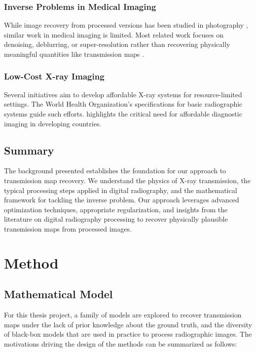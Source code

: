 \documentclass[nomenclature, english, bibtex]{kththesis}
\numberwithin{listing}{chapter}
\begin{document}
\subsection{Inverse Problems in Medical Imaging}
While image recovery from processed versions has been studied in photography \cite{moran2020deeptone}, similar work in medical imaging is limited. Most related work focuses on denoising, deblurring, or super-resolution rather than recovering physically meaningful quantities like transmission maps \cite{jin2017deep}.

\subsection{Low-Cost X-ray Imaging}
Several initiatives aim to develop affordable X-ray systems for resource-limited settings. The World Health Organization's specifications for basic radiographic systems \cite{who2014specifications} guide such efforts. \cite{mollura2010radiology} highlights the critical need for affordable diagnostic imaging in developing countries.

\section{Summary}
The background presented establishes the foundation for our approach to transmission map recovery. We understand the physics of X-ray transmission, the typical processing steps applied in digital radiography, and the mathematical framework for tackling the inverse problem. Our approach leverages advanced optimization techniques, appropriate regularization, and insights from the literature on digital radiography processing to recover physically plausible transmission maps from processed images.

\chapter{Method}

\section{Mathematical Model}
\label{sec:mathematicalModel}

For this thesis project, a family of models  are explored to recover transmission maps under the lack of prior knowledge about the ground truth, and the
diversity of black-box models that are used in practice to process radiographic images. The motivations  driving the design of the methods can be summarized as follows:
\end{document}
